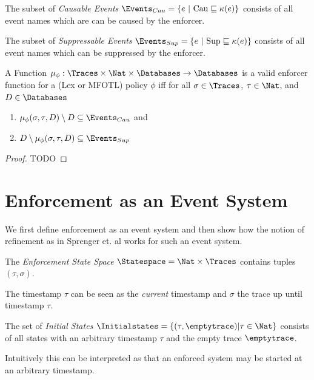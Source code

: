\begin{definition}
    \label{def:cau-events}
    The subset of \emph{Causable Events}
    $\Events_{Cau} = \left\lbrace e~|~\text{Cau} \sqsubseteq \kappa(e) \right\rbrace$
    consists of all event names which are can be caused by the enforcer.
\end{definition}

\begin{definition}
    \label{def:cau-events}
    The subset of \emph{Suppressable Events}
    $\Events_{Sup} = \left\lbrace e~|~\text{Sup} \sqsubseteq \kappa(e) \right\rbrace$
    consists of all event names which can be suppressed by the enforcer.
\end{definition}

\begin{theorem}
    A Function $\mu_\phi : \Traces \times \Nat \times \Databases \to \Databases$
    is a valid enforcer function for a (Lex or MFOTL) policy $\phi$ iff
    for all $\sigma \in \Traces$, $\tau \in \Nat$, and $D \in \Databases$
    \begin{enumerate}
        \item $\mu_\phi(\sigma, \tau, D) \setminus D \subseteq \Events_{Cau}$ and
        \item $D \setminus \mu_\phi(\sigma, \tau, D) \subseteq \Events_{Sup}$
    \end{enumerate}
\end{theorem}

\begin{proof}
    TODO
\end{proof}

\section{Enforcement as an Event System}

We first define enforcement as an event system and then show how the notion of refinement as in Sprenger et. al \cite{igloo} works for such an event system.

\begin{definition}
    \label{def:enf-state-space}
    The \emph{Enforcement State Space} $\Statespace = \Nat \times \Traces$
    contains tuples $(\tau,\sigma)$.
\end{definition}
The timestamp $\tau$ can be seen as the \emph{current} timestamp
and $\sigma$ the trace up until timestamp $\tau$.

\begin{definition}
    \label{def:enf-initial-states}
    The set of \emph{Initial States}
    $\Initialstates = \lbrace (\tau, \emptytrace) | \tau \in \Nat \rbrace$
    consists of all states with an arbitrary timestamp $\tau$ and the empty trace
    $\emptytrace$.
\end{definition}
Intuitively this can be interpreted as that an enforced system may be
started at an arbitrary timestamp.

